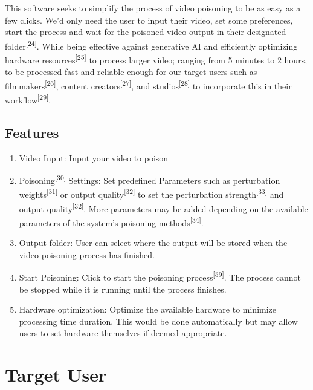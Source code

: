 This software seeks to simplify the process of video poisoning to be as easy as a few clicks.
We'd only need the user to input their video, set some preferences, start the process and wait for the poisoned video output in their designated folder\textsuperscript{[24]}.
While being effective against generative AI and efficiently optimizing hardware resources\textsuperscript{[25]} to process larger video; ranging from 5 minutes to 2 hours, to be processed fast and reliable enough for our target users such as filmmakers\textsuperscript{[26]}, content creators\textsuperscript{[27]}, and studios\textsuperscript{[28]} to incorporate this in their workflow\textsuperscript{[29]}.

\subsection{Features}
\label{subsection:features}

\begin{enumerate}[leftmargin=80pt]
    \item Video Input: Input your video to poison
    \item Poisoning\textsuperscript{[30]} Settings: Set predefined Parameters such as perturbation weights\textsuperscript{[31]} or output quality\textsuperscript{[32]} to set the perturbation strength\textsuperscript{[33]} and output quality\textsuperscript{[32]}. More parameters may be added depending on the available parameters of the system's poisoning methods\textsuperscript{[34]}.
    \item Output folder: User can select where the output will be stored when the video poisoning process has finished.
    \item Start Poisoning: Click to start the poisoning process\textsuperscript{[59]}. The process cannot be stopped while it is running until the process finishes.
    \item Hardware optimization: Optimize the available hardware to minimize processing time duration. This would be done automatically but may allow users to set hardware themselves if deemed appropriate.
\end{enumerate}

\section{Target User}
\label{section:target-user}

